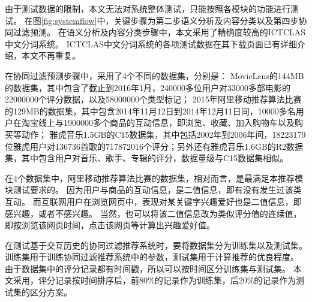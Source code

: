 由于测试数据的限制，本文无法对系统整体测试，只能按照各模块的功能进行测试。
在图\ref{fig:systemflow}中，关键步骤为第二步语义分析及内容分类以及第四步协同过滤预测。
在语义分析及内容分类步骤中，本文采用了精确度较高的ICTCLAS中文分词系统\parencite{Zhang2003CLA}。
ICTCLAS中文分词系统的各项测试数据在其下载页面已有详细介绍，本文不再重复。

在协同过滤预测步骤中，采用了4个不同的数据集，分别是：
MovieLens的144MB的数据集，其中包含了截止到2016年1月，240000多位用户对33000多部电影的22000000个评分数据，以及58000000个类型标记；
2015年阿里移动推荐算法比赛的129MB的数据集，其中包含2014年11月12日到2014年12月11日间，10000多名用户在淘宝线上与1900000多个商品的互动信息，即浏览、收藏、加入购物车以及购买等动作；
雅虎音乐1.5GB的C15数据集，其中包括2002年到2006年间，18223179位雅虎用户对136736首歌的717872016个评分；另外还有雅虎音乐1.6GB的R2数据集，其中包含用户对音乐、歌手、专辑的评分，数据量级与C15数据集相似。

在4个数据集中，阿里移动推荐算法比赛的数据集，相对而言，是最满足本推荐模块测试要求的。
因为用户与商品的互动信息，是二值信息，即有没有发生过该类互动。
而互联网用户在浏览网页中，表现对某关键字兴趣爱好也是二值信息，即感兴趣，或者不感兴趣。
当然，也可以将该二值信息改为类似评分值的连续值，即按浏览该网页时间，点击该网页等计算出兴趣爱好值。

在测试基于交互历史的协同过滤推荐系统时，要将数据集分为训练集以及测试集。
训练集用于训练协同过滤推荐系统中的参数，测试集用于计算推荐的优良程度。
由于数据集中的评分记录都有时间戳，所以可以按时间区分训练集与测试集。
本文采用，评分记录按时间排序后，前80\%的记录作为训练集，后20\%的记录作为测试集的区分方案。

